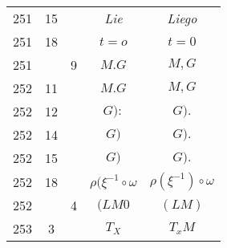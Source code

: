 \documentclass[a4paper,11pt]{article}
\begin{document}
\begin{center}
\begin{tabular}{|c|c|c|c|c|}
    251 & 15 & & \textit{Lie} & \textit{Liego} \\
    251 & 18 & & $t = o$ & $t = 0$ \\
    251 & & \hphantom{0}9 & $M.G$ & $M, G$ \\
    252 & 11 & & $M.G$ & $M, G$ \\
    252 & 12 & & $G):$ & $G).$ \\
    252 & 14 & & $G)$ & $G).$ \\
    252 & 15 & & $G)$ & $G).$ \\
    252 & 18 & & $\rho( \xi^{ -1 } \circ \omega$
           & $\rho( \xi^{ -1 } ) \circ \omega$ \\
    252 & & \hphantom{0}4 & $( LM 0$ & $( LM )$ \\
    253 & \hphantom{0}3 & & $T_{ X }$ & $T_{ x }M$ \\

\end{tabular}
\end{center}
\end{document}
